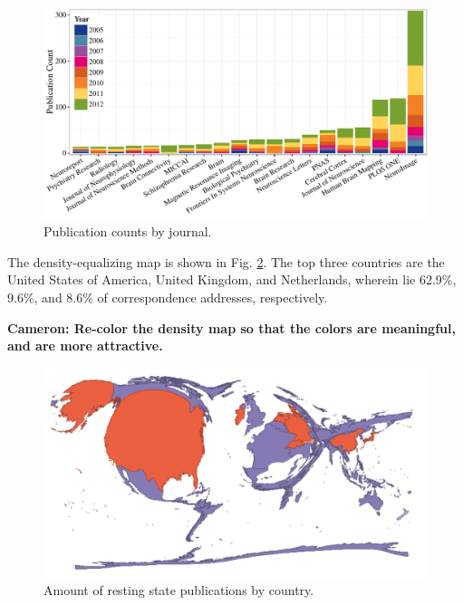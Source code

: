 \documentclass[12pt,5p]{elsarticle}
\newcommand\MyCBox[1]{%
  \colorbox{yellow!60}{\begin{varwidth}{\dimexpr\linewidth-2\fboxsep}#1\end{varwidth}}}
\newcommand{\COMMENTCC}[1]{\MyCBox{\textcolor{cc_commentcolor}{\textbf{Cameron:
#1}}}}
\begin{document}
\begin{figure}
  \begin{center}
    \includegraphics[]{figures/journal_dist}%
    \caption{Publication counts by journal.
        \label{fig:journal_dist}
    }
  \end{center}
\end{figure}

The density-equalizing map is shown in Fig.
\ref{fig:resting_state_map}.  The top three countries are the United States of
America, United Kingdom, and Netherlands, wherein lie 62.9\%, 9.6\%, and 8.6\%
of correspondence addresses, respectively.
\COMMENTCC{Re-color the density map so that the colors are meaningful, and are
more attractive.} 

\begin{figure}
  \begin{center}
    \includegraphics[width=\linewidth]{figures/resting_state_map}%
    \caption{Amount of resting state publications by country.
        \label{fig:resting_state_map}
    }
  \end{center}
\end{figure}
\end{document}
